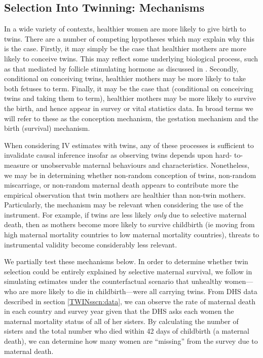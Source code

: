 \subsection{Selection Into Twinning: Mechanisms}   \label{TWINsscn:selection}
In a wide variety of contexts, healthier women are more likely to give birth to
twins.  There are a number of competing hypotheses which may explain why this is
the case.  Firstly, it may simply be the case that healthier mothers are more 
likely to conceive twins.  This may reflect some underlying biological process, 
such as that mediated by follicle stimulating hormone as discussed in 
\citet{Hall2003}.  Secondly, conditional on conceiving twins, healthier mothers 
may be more likely to take both fetuses to term.  Finally, it may be the case 
that (conditional on conceiving twins and taking them to term), healthier mothers 
may be more likely to survive the birth, and hence appear in survey or vital 
statistics data.  In broad terms we will refer to these as the conception 
mechanism, the gestation mechanism and the birth (survival) mechanism.

When considering IV estimates with twins, any of these processes is sufficient 
to invalidate causal inference insofar as observing twins depends upon hard-%
to-measure or unobservable maternal behaviours and characteristics. Nonetheless, 
we may be in determining whether non-random conception of twins, non-random 
miscarriage, or non-random maternal death appears to contribute more the 
empirical observation that twin mothers are healthier than non-twin mothers.
Particularly, the mechanism may be relevant when considering the use of the 
instrument.  For example, if twins are less likely \emph{only} due to selective 
maternal death, then as mothers become more likely to survive childbirth (ie
moving from high maternal mortality countries to low maternal mortality 
countries), threats to instrumental validity become considerably less 
relevant.

We partially test these mechanisms below.  In order to determine whether twin 
selection could be entirely explained by selective maternal survival, we 
follow \citet{Aldermanetal2011} in simulating estimates under the 
counterfactual scenario that unhealthy women---who are more likely to die in 
childbirth---were all carrying twins.  From DHS data described in section
\ref{TWINsscn:data}, we can observe the rate of maternal death in each country
and survey year given that the DHS asks each women the maternal mortality 
status of all of her sisters. By calculating the number of sisters and the
total number who died within 42 days of childbirth (a maternal death), we can
determine how many women are ``missing'' from the survey due to maternal death.


